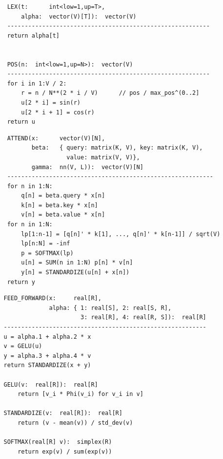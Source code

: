 \documentclass[9pt]{report}
\begin{document}
{\clearpage
\footnotesize
\begin{verbatim}
    LEX(t:      int<low=1,up=T>,
        alpha:  vector(V)[T]):  vector(V)  
    ----------------------------------------------------------
    return alpha[t]


    POS(n:  int<low=1,up=N>):  vector(V)
    ----------------------------------------------------------
    for i in 1:V / 2:
        r = n / N**(2 * i / V)      // pos / max_pos^(0..2]
        u[2 * i] = sin(r)
        u[2 * i + 1] = cos(r)
    return u
\end{verbatim}

\clearpage
\footnotesize
\begin{verbatim}
    ATTEND(x:      vector(V)[N],
           beta:   { query: matrix(K, V), key: matrix(K, V),
                     value: matrix(V, V)},
           gamma:  nn(V, L)):  vector(V)[N]
    -----------------------------------------------------------
    for n in 1:N:
        q[n] = beta.query * x[n]
        k[n] = beta.key * x[n]
        v[n] = beta.value * x[n]
    for n in 1:N:
        lp[1:n-1] = [q[n]' * k[1], ..., q[n]' * k[n-1]] / sqrt(V)
        lp[n:N] = -inf                                 
        p = SOFTMAX(lp)                                
        u[n] = SUM(n in 1:N) p[n] * v[n]               
        y[n] = STANDARDIZE(u[n] + x[n])                
    return y
\end{verbatim}

\clearpage
\begin{verbatim}
   FEED_FORWARD(x:     real[R], 
                alpha: { 1: real[S], 2: real[S, R], 
                         3: real[R], 4: real[R, S]):  real[R]
   ----------------------------------------------------------
   u = alpha.1 + alpha.2 * x
   v = GELU(u)              
   y = alpha.3 + alpha.4 * v
   return STANDARDIZE(x + y)

   GELU(v:  real[R]):  real[R]
       return [v_i * Phi(v_i) for v_i in v]

   STANDARDIZE(v:  real[R]):  real[R]
       return (v - mean(v)) / std_dev(v)

   SOFTMAX(real[R] v):  simplex(R)
       return exp(v) / sum(exp(v))
\end{verbatim}
\normalsize
\renewcommand{\baselinestretch}{1}

}
\end{document}
